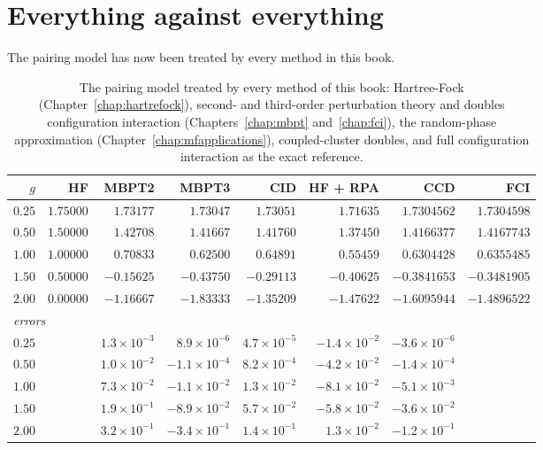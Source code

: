 \section{Everything against everything}
\label{sec:cccomparison}

The pairing model has now been treated by every method in this book.

\begin{table}[h]
\centering
\renewcommand{\arraystretch}{1.25}
\setlength{\tabcolsep}{6pt}
\small
\begin{tabular}{rrrrrrrr}
\toprule
$g$ & HF & MBPT2 & MBPT3 & CID & HF + RPA & CCD & FCI\\
\midrule
$0.25$ & $1.75000$ & $1.73177$ & $1.73047$ & $1.73051$ & $1.71635$
  & $1.7304562$ & $1.7304598$\\
$0.50$ & $1.50000$ & $1.42708$ & $1.41667$ & $1.41760$ & $1.37450$
  & $1.4166377$ & $1.4167743$\\
$1.00$ & $1.00000$ & $0.70833$ & $0.62500$ & $0.64891$ & $0.55459$
  & $0.6304428$ & $0.6355485$\\
$1.50$ & $0.50000$ & $-0.15625$ & $-0.43750$ & $-0.29113$ & $-0.40625$
  & $-0.3841653$ & $-0.3481905$\\
$2.00$ & $0.00000$ & $-1.16667$ & $-1.83333$ & $-1.35209$ & $-1.47622$
  & $-1.6095944$ & $-1.4896522$\\
\midrule
\multicolumn{8}{l}{\emph{errors}}\\
$0.25$ & & $1.3\times10^{-3}$ & $8.9\times10^{-6}$ & $4.7\times10^{-5}$
  & $-1.4\times10^{-2}$ & $-3.6\times10^{-6}$ & \\
$0.50$ & & $1.0\times10^{-2}$ & $-1.1\times10^{-4}$ & $8.2\times10^{-4}$
  & $-4.2\times10^{-2}$ & $-1.4\times10^{-4}$ & \\
$1.00$ & & $7.3\times10^{-2}$ & $-1.1\times10^{-2}$ & $1.3\times10^{-2}$
  & $-8.1\times10^{-2}$ & $-5.1\times10^{-3}$ & \\
$1.50$ & & $1.9\times10^{-1}$ & $-8.9\times10^{-2}$ & $5.7\times10^{-2}$
  & $-5.8\times10^{-2}$ & $-3.6\times10^{-2}$ & \\
$2.00$ & & $3.2\times10^{-1}$ & $-3.4\times10^{-1}$ & $1.4\times10^{-1}$
  & $1.3\times10^{-2}$ & $-1.2\times10^{-1}$ & \\
\bottomrule
\end{tabular}
\caption{The pairing model treated by every method of this book:
Hartree-Fock (Chapter~\ref{chap:hartrefock}), second- and third-order
perturbation theory and doubles configuration interaction
(Chapters~\ref{chap:mbpt} and~\ref{chap:fci}), the random-phase
approximation (Chapter~\ref{chap:mfapplications}), coupled-cluster doubles,
and full configuration interaction as the exact reference.}
\label{tab:cccomparison}
\end{table}


